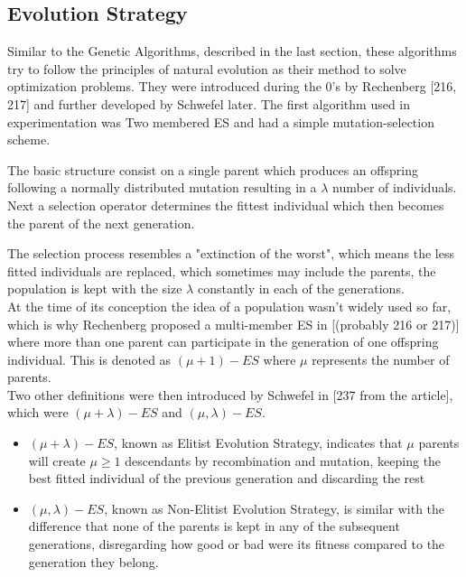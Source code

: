 \subsection{Evolution Strategy}

Similar to the Genetic Algorithms, described in the last section, these algorithms try to follow the principles of natural evolution as their method to solve optimization problems. They were introduced during the 0's by Rechenberg [216, 217] and further developed by Schwefel later. The first algorithm used in experimentation was Two membered ES and had a simple mutation-selection scheme.

The basic structure consist on a single parent which produces an offspring following a normally distributed mutation resulting in a $\lambda$ number of individuals. Next a selection operator determines the fittest individual which then becomes the parent of the next generation.

The selection process resembles a "extinction of the worst", which means the less fitted individuals are replaced, which sometimes may include the parents, the population is kept with the size $\lambda$ constantly in each of the generations.\\

At the time of its conception the idea of a population wasn't widely used so far, which is why Rechenberg proposed a multi-member ES in [(probably 216 or 217)] where more than one parent can participate in the generation of one offspring individual. This is denoted as $(\mu + 1) - ES$ where $\mu$ represents the number of parents.\\ 

Two other definitions were then introduced by Schwefel in [237 from the article], which were $(\mu + \lambda) - ES$ and $(\mu, \lambda) - ES$.\\

\begin{itemize}
    \item $(\mu + \lambda) - ES$, known as Elitist Evolution Strategy, indicates that $\mu$ parents will create $\mu \geq 1$ descendants by recombination and mutation, keeping the best fitted individual of the previous generation and discarding the rest
    \item $(\mu, \lambda) - ES$, known as Non-Elitist Evolution Strategy, is similar with the difference that none of the parents is kept in any of the subsequent generations, disregarding how good or bad were its fitness compared to the generation they belong.
\end{itemize}\\

